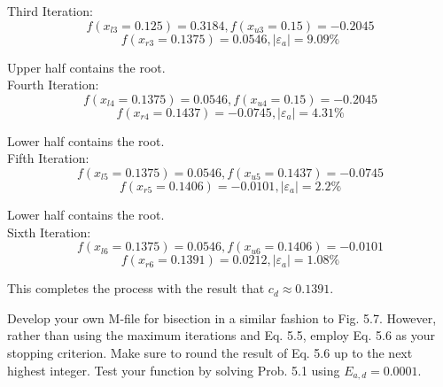 \documentclass{article}
\begin{document}
Third Iteration:
\[ f(x_{l3}=0.125) = 0.3184, f(x_{u3}=0.15) = -0.2045 \]
\[ f(x_{r3}=0.1375) = 0.0546, \left| \varepsilon_{a} \right| = 9.09\% \]

Upper half contains the root.\\

Fourth Iteration:
\[ f(x_{l4}=0.1375) = 0.0546, f(x_{u4}=0.15) = -0.2045 \]
\[ f(x_{r4}=0.1437) = -0.0745, \left| \varepsilon_{a} \right| = 4.31\% \]

Lower half contains the root.\\

Fifth Iteration:
\[ f(x_{l5}=0.1375) = 0.0546, f(x_{u5}=0.1437) = -0.0745 \]
\[ f(x_{r5}=0.1406) = -0.0101, \left| \varepsilon_{a} \right| = 2.2\% \]

Lower half contains the root.\\

Sixth Iteration:
\[ f(x_{l6}=0.1375) = 0.0546, f(x_{u6}=0.1406) = -0.0101 \]
\[ f(x_{r6}=0.1391) = 0.0212, \left| \varepsilon_{a} \right| = 1.08\% \]

This completes the process with the result that $\boxed{c_{d}\approx 0.1391}$.

\begin{problem}

	Develop your own M-file for bisection in a similar fashion to Fig. 5.7. However, rather than using the maximum iterations and Eq. 5.5, employ Eq. 5.6 as your stopping criterion. Make sure to round the result of Eq. 5.6 up to the next highest integer. Test your function by solving Prob. 5.1 using $E_{a,d}=0.0001$.
	
\end{problem}
\end{document}
